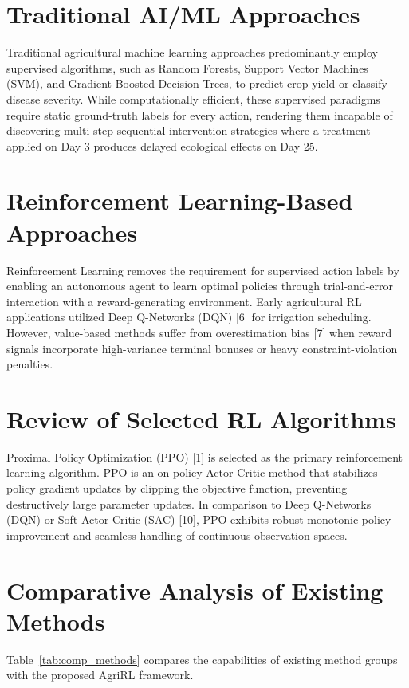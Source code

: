 \documentclass[12pt,a4paper]{report}
\begin{document}
\section{Traditional AI/ML Approaches}
Traditional agricultural machine learning approaches predominantly employ supervised algorithms, such as Random Forests, Support Vector Machines (SVM), and Gradient Boosted Decision Trees, to predict crop yield or classify disease severity. While computationally efficient, these supervised paradigms require static ground-truth labels for every action, rendering them incapable of discovering multi-step sequential intervention strategies where a treatment applied on Day 3 produces delayed ecological effects on Day 25.

\section{Reinforcement Learning-Based Approaches}
Reinforcement Learning removes the requirement for supervised action labels by enabling an autonomous agent to learn optimal policies through trial-and-error interaction with a reward-generating environment. Early agricultural RL applications utilized Deep Q-Networks (DQN) [6] for irrigation scheduling. However, value-based methods suffer from overestimation bias [7] when reward signals incorporate high-variance terminal bonuses or heavy constraint-violation penalties.

\section{Review of Selected RL Algorithms}
Proximal Policy Optimization (PPO) [1] is selected as the primary reinforcement learning algorithm. PPO is an on-policy Actor-Critic method that stabilizes policy gradient updates by clipping the objective function, preventing destructively large parameter updates. In comparison to Deep Q-Networks (DQN) or Soft Actor-Critic (SAC) [10], PPO exhibits robust monotonic policy improvement and seamless handling of continuous observation spaces.

\section{Comparative Analysis of Existing Methods}
Table~\ref{tab:comp_methods} compares the capabilities of existing method groups with the proposed AgriRL framework.
\end{document}
